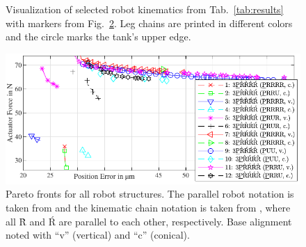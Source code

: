 \documentclass{svproc}
\begin{document}
\begin{figure}[b!]
\vspace{-0.7cm} %
\centering

\vspace{-0.7cm}
\caption{Visualization of selected robot kinematics from Tab.~\ref{tab:results} with markers from Fig.~\ref{fig:pareto_all}. Leg chains are printed in different colors and the circle marks the tank's upper edge.}
\label{fig:robot_examples1}
\end{figure} 

\begin{figure}[p]
\includegraphics{pareto_all.pdf}
\vspace{-0.8cm} %
\caption{Pareto fronts for all robot structures. The parallel robot notation is taken from \cite{Merlet2006} and the kinematic chain notation is taken from \cite{KongGos2007}, where all \`R and \'R are parallel to each other, respectively. Base alignment noted with ``v'' (vertical) and ``c'' (conical).}
\label{fig:pareto_all}
\end{figure}
%
\newcommand{\vcenteredinclude}[1]{\begingroup
	\setbox0=\hbox{\texttt{[image: \#1]}}%
	\parbox{\wd0}{\box0}\endgroup}
%
\end{document}
